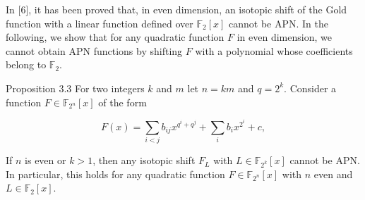\documentclass[10pt]{article}
\begin{document}
In [6], it has been proved that, in even dimension, an isotopic shift of the Gold function with a linear function defined over $\mathbb{F}_{2}[x]$ cannot be APN. In the following, we show that for any quadratic function $F$ in even dimension, we cannot obtain APN functions by shifting $F$ with a polynomial whose coefficients belong to $\mathbb{F}_{2}$.

Proposition 3.3 For two integers $k$ and $m$ let $n=k m$ and $q=2^{k}$. Consider a function $F \in \mathbb{F}_{2^{n}}[x]$ of the form

$$
F(x)=\sum_{i<j} b_{i j} x^{q^{i}+q^{j}}+\sum_{i} b_{i} x^{2^{i}}+c,
$$

If $n$ is even or $k>1$, then any isotopic shift $F_{L}$ with $L \in \mathbb{F}_{2^{k}}[x]$ cannot be APN. In particular, this holds for any quadratic function $F \in \mathbb{F}_{2^{n}}[x]$ with $n$ even and $L \in \mathbb{F}_{2}[x]$.
\end{document}
